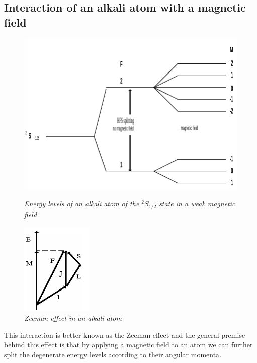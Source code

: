 \documentclass[twocolumn]{article}
\begin{document}
\subsection{Interaction of an alkali atom with a magnetic field}
\begin{figure}
\center
\begin{minipage}{0.45\linewidth}
\includegraphics[width=\linewidth]{pictures/zeeman-splitting.png}
\caption{\textit{Energy levels of an alkali atom of the $^2S_{1/2}$ state in a 
weak magnetic field \cite{ref:3}}}
\label{fig:5}
\end{minipage}
\hfill
\begin{minipage}{0.45\linewidth}
\includegraphics[width=0.3\linewidth]{pictures/zeeman-vectors.png}
\caption{\textit{Zeeman effect in an alkali atom \cite{ref:3}}}
\label{fig:6}
\end{minipage}
\end{figure}
This interaction is better known as the Zeeman effect and the general premise 
behind this effect is that by applying a magnetic field to an atom we can 
further split the degenerate energy levels according to their angular momenta.
\\
\end{document}
